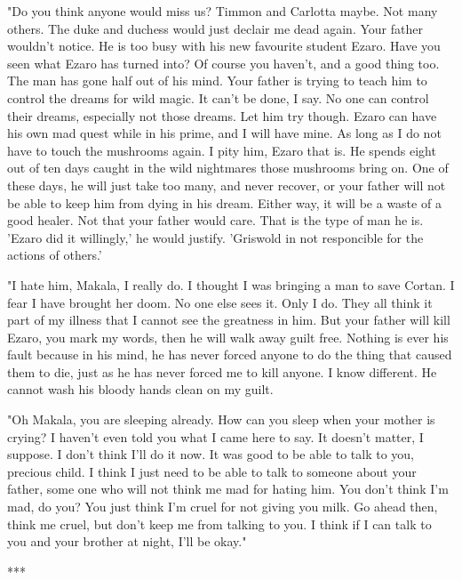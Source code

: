 \documentclass{article}
\begin{document}
"Do you think anyone would miss us? Timmon and Carlotta maybe. Not many others. The duke and duchess would just declair me dead again. Your father wouldn't notice. He is too busy with his new favourite student Ezaro. Have you seen what Ezaro has turned into? Of course you haven't, and a good thing too. The man has gone half out of his mind. Your father is trying to teach him to control the dreams for wild magic. It can't be done, I say. No one can control their dreams, especially not those dreams. Let him try though. Ezaro can have his own mad quest while in his prime, and I will have mine. As long as I do not have to touch the mushrooms again. I pity him, Ezaro that is. He spends eight out of ten days caught in the wild nightmares those mushrooms bring on. One of these days, he will just take too many, and never recover, or your father will not be able to keep him from dying in his dream. Either way, it will be a waste of a good healer. Not that your father would care. That is the type of man he is. 'Ezaro did it willingly,' he would justify. 'Griswold in not responcible for the actions of others.'

"I hate him, Makala, I really do. I thought I was bringing a man to save Cortan. I fear I have brought her doom. No one else sees it. Only I do. They all think it part of my illness that I cannot see the greatness in him. But your father will kill Ezaro, you mark my words, then he will walk away guilt free. Nothing is ever his fault because in his mind, he has never forced anyone to do the thing that caused them to die, just as he has never forced me to kill anyone. I know different. He cannot wash his bloody hands clean on my guilt. 

"Oh Makala, you are sleeping already. How can you sleep when your mother is crying? I haven't even told you what I came here to say. It doesn't matter, I suppose. I don't think I'll do it now. It was good to be able to talk to you, precious child. I think I just need to be able to talk to someone about your father, some one who will not think me mad for hating him. You don't think I'm mad, do you? You just think I'm cruel for not giving you milk. Go ahead then, think me cruel, but don't keep me from talking to you. I think if I can talk to you and your brother at night, I'll be okay."

***

\vspace{.5cm}
\end{document}
